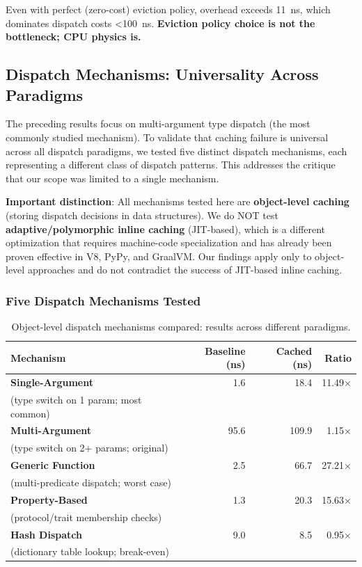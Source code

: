\documentclass[sigplan,final]{acmart}
\begin{document}
Even with perfect (zero-cost) eviction policy, overhead exceeds 11~ns, which dominates dispatch
costs <100~ns. \textbf{Eviction policy choice is not the bottleneck; CPU physics is.}

\subsection{Dispatch Mechanisms: Universality Across Paradigms}
\label{sec:dispatch-mechanisms}

The preceding results focus on multi-argument type dispatch (the most commonly studied mechanism).
To validate that caching failure is universal across all dispatch paradigms, we tested five distinct
dispatch mechanisms, each representing a different class of dispatch patterns. This addresses the
critique that our scope was limited to a single mechanism.

\textbf{Important distinction}: All mechanisms tested here are \textbf{object-level caching} (storing
dispatch decisions in data structures). We do NOT test \textbf{adaptive/polymorphic inline caching}
(JIT-based), which is a different optimization that requires machine-code specialization and has
already been proven effective in V8, PyPy, and GraalVM. Our findings apply only to object-level
approaches and do not contradict the success of JIT-based inline caching.

\subsubsection{Five Dispatch Mechanisms Tested}

\begin{table}[h]
\centering
\caption{Object-level dispatch mechanisms compared: results across different paradigms.}
\label{tab:mechanisms}
\begin{tabular}{@{}lrrr@{}}
\toprule
\textbf{Mechanism} & \textbf{Baseline (ns)} & \textbf{Cached (ns)} & \textbf{Ratio} \\
\midrule
\textbf{Single-Argument} & 1.6 & 18.4 & 11.49× \\
\quad (type switch on 1 param; most common) \\
\textbf{Multi-Argument} & 95.6 & 109.9 & 1.15× \\
\quad (type switch on 2+ params; original) \\
\textbf{Generic Function} & 2.5 & 66.7 & 27.21× \\
\quad (multi-predicate dispatch; worst case) \\
\textbf{Property-Based} & 1.3 & 20.3 & 15.63× \\
\quad (protocol/trait membership checks) \\
\textbf{Hash Dispatch} & 9.0 & 8.5 & 0.95× \\
\quad (dictionary table lookup; break-even) \\
\bottomrule
\end{tabular}
\end{table}
\end{document}
